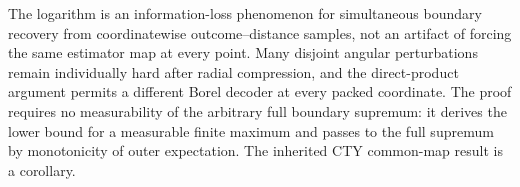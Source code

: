 The logarithm is an information-loss phenomenon for simultaneous boundary recovery from coordinatewise outcome--distance samples, not an artifact of forcing the same estimator map at every point.  Many disjoint angular perturbations remain individually hard after radial compression, and the direct-product argument permits a different Borel decoder at every packed coordinate.  The proof requires no measurability of the arbitrary full boundary supremum: it derives the lower bound for a measurable finite maximum and passes to the full supremum by monotonicity of outer expectation.  The inherited CTY common-map result is a corollary.